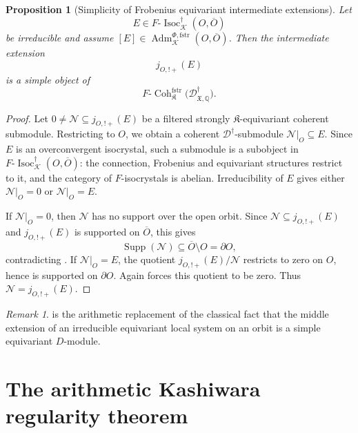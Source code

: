 \documentclass[11pt]{amsart}
\theoremstyle{plain}
\newtheorem{proposition}{Proposition}[section]
\theoremstyle{definition}
\theoremstyle{remark}
\newtheorem{remark}{Remark}[section]
\newcommand{\Coh}{\operatorname{Coh}}
\newcommand{\Isoc}{\operatorname{Isoc}}
\newcommand{\Supp}{\operatorname{Supp}}
\newcommand{\fstr}{\mathrm{fstr}}
\newcommand{\Adm}{\operatorname{Adm}}
\begin{document}
\begin{proposition}[Simplicity of Frobenius equivariant intermediate extensions]
\label{prop:simplicity-intermediate-extension}
Let
\[
  E\in F\text{-}\Isoc^{\dagger}_{\mathcal K}(O,\overline O)
\]
be irreducible and assume \([E]\in\Adm^{\Phi,\fstr}_{\mathcal K}(O,\overline O)\). Then the intermediate extension
\[
  j_{O,!+}(E)
\]
is a simple object of
\[
  F\text{-}\Coh^{\fstr}_{\mathfrak K}
  \bigl(\mathscr D^\dagger_{\mathfrak X,\mathbb Q}\bigr).
\]
\end{proposition}

\begin{proof}
Let \(0\neq \mathcal N\subseteq j_{O,!+}(E)\) be a filtered strongly
\(\mathfrak K\)-equivariant coherent submodule. Restricting to \(O\), we obtain
a coherent \(\mathscr D^\dagger\)-submodule \(\mathcal N|_O\subseteq E\). Since
\(E\) is an overconvergent isocrystal, such a submodule is a subobject in
\(F\text{-}\Isoc^\dagger_{\mathcal K}(O,\overline O)\): the connection,
Frobenius and equivariant structures restrict to it, and the category of
\(F\)-isocrystals is abelian. Irreducibility of \(E\) gives either
\(\mathcal N|_O=0\) or \(\mathcal N|_O=E\).

If \(\mathcal N|_O=0\), then \(\mathcal N\) has no support over the open orbit.
Since \(\mathcal N\subseteq j_{O,!+}(E)\) and \(j_{O,!+}(E)\) is supported on
\(\overline O\), this gives
\[
  \Supp(\mathcal N)\subseteq \overline O\setminus O=\partial O,
\]
contradicting . If \(\mathcal N|_O=E\), the
quotient \(j_{O,!+}(E)/\mathcal N\) restricts to zero on \(O\), hence is
supported on \(\partial O\). Again  forces
this quotient to be zero. Thus \(\mathcal N=j_{O,!+}(E)\).
\end{proof}

\begin{remark}
\label{rem:intermediate-extension-role}
 is the arithmetic replacement of
the classical fact that the middle extension of an irreducible equivariant local
system on an orbit is a simple equivariant \(D\)-module.
\end{remark}

\section{The arithmetic Kashiwara regularity theorem}
\label{sec:regularity}
\end{document}
